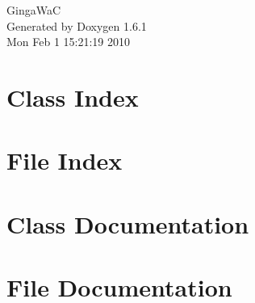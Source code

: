 \documentclass[a4paper]{book}
\begin{document}
\hypersetup{pageanchor=false}
\begin{titlepage}
\vspace*{7cm}
\begin{center}
{\Large GingaWaC }\\
\vspace*{1cm}
{\large Generated by Doxygen 1.6.1}\\
\vspace*{0.5cm}
{\small Mon Feb 1 15:21:19 2010}\\
\end{center}
\end{titlepage}
\clearemptydoublepage
{}
\tableofcontents
\clearemptydoublepage
{}
\hypersetup{pageanchor=true}
\chapter{Class Index}

\chapter{File Index}

\chapter{Class Documentation}




\chapter{File Documentation}




\printindex
\end{document}
